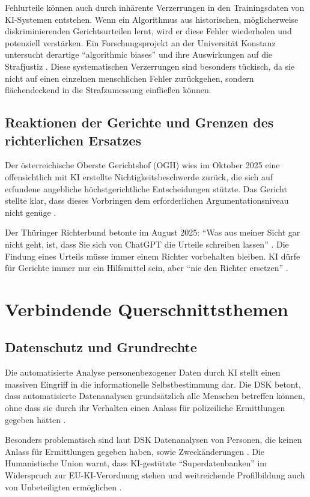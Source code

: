 \documentclass[12pt,a4paper]{article}
\begin{document}
	Fehlurteile können auch durch inhärente Verzerrungen in den Trainingsdaten von KI-Systemen entstehen. Wenn ein Algorithmus aus historischen, möglicherweise diskriminierenden Gerichtsurteilen lernt, wird er diese Fehler wiederholen und potenziell verstärken. Ein Forschungsprojekt an der Universität Konstanz untersucht derartige \enquote{algorithmic biases} und ihre Auswirkungen auf die Strafjustiz \cite{Uni Konstanz2025}. Diese systematischen Verzerrungen sind besonders tückisch, da sie nicht auf einen einzelnen menschlichen Fehler zurückgehen, sondern flächendeckend in die Strafzumessung einfließen können.
	
	\subsection{Reaktionen der Gerichte und Grenzen des richterlichen Ersatzes}
	
	Der österreichische Oberste Gerichtshof (OGH) wies im Oktober 2025 eine offensichtlich mit KI erstellte Nichtigkeitsbeschwerde zurück, die sich auf erfundene angebliche höchstgerichtliche Entscheidungen stützte. Das Gericht stellte klar, dass dieses Vorbringen dem erforderlichen Argumentationsniveau nicht genüge \cite{OGH2025}.
	
	Der Thüringer Richterbund betonte im August 2025: \enquote{Was aus meiner Sicht gar nicht geht, ist, dass Sie sich von ChatGPT die Urteile schreiben lassen} \cite{Richterbund2025}. Die Findung eines Urteils müsse immer einem Richter vorbehalten bleiben. KI dürfe für Gerichte immer nur ein Hilfsmittel sein, aber \enquote{nie den Richter ersetzen} \cite{Richterbund2025}.
	
	\section{Verbindende Querschnittsthemen}
	
	\subsection{Datenschutz und Grundrechte}
	
	Die automatisierte Analyse personenbezogener Daten durch KI stellt einen massiven Eingriff in die informationelle Selbstbestimmung dar. Die DSK betont, dass automatisierte Datenanalysen grundsätzlich alle Menschen betreffen können, ohne dass sie durch ihr Verhalten einen Anlass für polizeiliche Ermittlungen gegeben hätten \cite{DSK2025}.
	
	Besonders problematisch sind laut DSK Datenanalysen von Personen, die keinen Anlass für Ermittlungen gegeben haben, sowie Zweckänderungen \cite{Datenschutzticker2025}. Die Humanistische Union warnt, dass KI-gestützte \enquote{Superdatenbanken} im Widerspruch zur EU-KI-Verordnung stehen und weitreichende Profilbildung auch von Unbeteiligten ermöglichen \cite{HumanUnion2025}.
	
\end{document}
